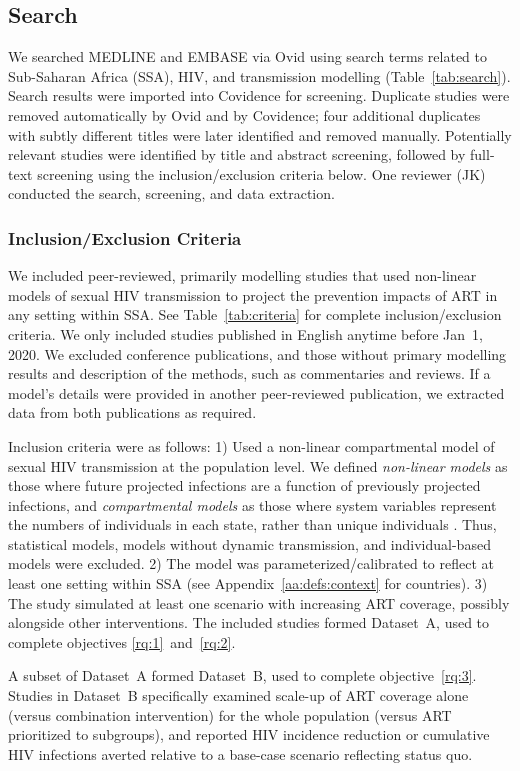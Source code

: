 \subsection{Search}
\label{ss:meth:search}
We searched MEDLINE and EMBASE via Ovid
using search terms related to Sub-Saharan Africa (SSA), HIV, and transmission modelling
(Table~\ref{tab:search}).
Search results were imported into Covidence \cite{Covidence} for screening.
Duplicate studies were removed automatically by Ovid and by Covidence;
four additional duplicates with subtly different titles were later identified and removed manually.
Potentially relevant studies were identified by title and abstract screening, followed 
by full-text screening using the inclusion/exclusion criteria below. 
One reviewer (JK) conducted the search, screening, and data extraction.
\subsubsection{Inclusion/Exclusion Criteria}
\label{sss:meth:criteria}
We included peer-reviewed, primarily modelling studies that used non-linear models of sexual HIV transmission
to project the prevention impacts of ART in any setting within SSA.
See Table~\ref{tab:criteria} for complete inclusion/exclusion criteria.
We only included studies published in English anytime before Jan~1, 2020.
We excluded conference publications, and those without primary modelling results and description of the methods,
such as commentaries and reviews.
If a model's details were provided in another peer-reviewed publication,
we extracted data from both publications as required.
\par
Inclusion criteria were as follows:
1) Used a non-linear compartmental model of sexual HIV transmission at the population level.
We defined \emph{non-linear models} as those where
future projected infections are a function of previously projected infections,
and \emph{compartmental models} as those where
system variables represent the numbers of individuals in each state,
rather than unique individuals \cite{Garnett2011}.
Thus, statistical models, models without dynamic transmission, and individual-based models were excluded.
2) The model was parameterized/calibrated to reflect at least one setting within SSA
(see Appendix~\ref{aa:defs:context} for countries).
3) The study simulated at least one scenario with increasing ART coverage,
possibly alongside other interventions.
The included studies formed Dataset~A,
used to complete objectives \ref{rq:1}~and~\ref{rq:2}.
\par
A subset of Dataset~A formed Dataset~B,
used to complete objective~\ref{rq:3}.
Studies in Dataset~B specifically examined
scale-up of ART coverage alone (versus combination intervention)
for the whole population (versus ART prioritized to subgroups),
and reported HIV incidence reduction or cumulative HIV infections averted
relative to a base-case scenario reflecting status quo.
